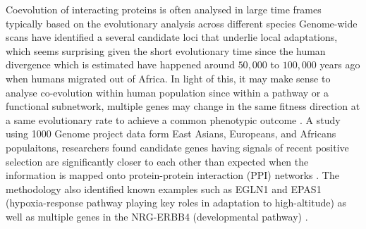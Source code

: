 
Coevolution of interacting proteins is often analysed in large time frames typically based on the evolutionary analysis across different species  \cite{qian2015recent}
Genome-wide scans have identified a several candidate loci that underlie local adaptations, which seems surprising given the short evolutionary time since the human divergence which is estimated have happened around $50,000$ to $100,000$ years ago when humans migrated out of Africa\cite{qian2015recent}.
In light of this, it may make sense to analyse co-evolution within human population
since within a pathway or a functional subnetwork, multiple genes may change in the same fitness direction at a same evolutionary rate to achieve a common phenotypic outcome \cite{qian2015recent}.
A study using 1000 Genome \cite{REF} project data form East Asians, Europeans, and Africans populaitons, researchers found candidate genes having signals of recent positive selection are significantly closer to each other than expected when the information is mapped onto protein-protein interaction (PPI) networks \cite{qian2015recent}.
The methodology also identified known examples such as EGLN1 and EPAS1 (hypoxia-response pathway playing key roles in adaptation to high-altitude) as well as multiple genes in the NRG-ERBB4 (developmental pathway) \cite{qian2015recent}.

